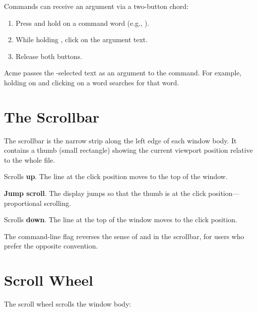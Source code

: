 Commands can receive an argument via a two-button chord:

\begin{enumerate}
\item Press and hold  on a command word (e.g., ).
\item While holding , click  on the argument text.
\item Release both buttons.
\end{enumerate}

Acme passes the -selected text as an argument to the
 command.  For example, holding  on 
and clicking  on a word searches for that word.

\section{The Scrollbar}
\label{sec:scrollbar}


The scrollbar is the narrow strip along the left edge of each window
body.  It contains a thumb (small rectangle) showing the current
viewport position relative to the whole file.

\begin{description}[style=nextline]
\item[\button{1} in scrollbar]
Scrolls \textbf{up}.  The line at the click position moves to the
top of the window.

\item[\button{2} in scrollbar]
\textbf{Jump scroll}.  The display jumps so that the thumb is at the
click position---proportional scrolling.

\item[\button{3} in scrollbar]
Scrolls \textbf{down}.  The line at the top of the window moves to
the click position.
\end{description}

The  command-line flag reverses the sense of  and
 in the scrollbar, for users who prefer the opposite
convention.

\section{Scroll Wheel}
\label{sec:scrollwheel}


The scroll wheel scrolls the window body:

